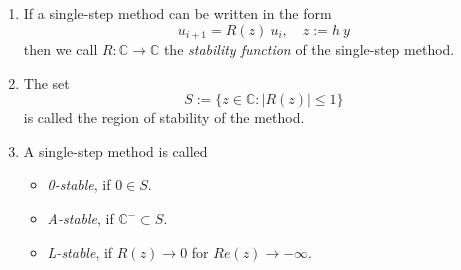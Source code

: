 		\begin{definition}
			\begin{enumerate}
				\item 
				If a single-step method can be written in the form
				\begin{equation}
					u_{i+1} = R(z) \ u_i, \quad z:= h \ y
				\end{equation}
				then we call $R: \mathbb{C} \to \mathbb{C}$ the \emph{stability function} of the single-step method.
				\item 
				The set
				\begin{equation}
					S := \{z \in \mathbb{C} : |R(z)| \leq 1\}
				\end{equation}
				is called the region of stability of the method.
				\item 
				A single-step method is called
				\begin{itemize}
					\item \emph{0-stable}, if $0 \in S$.
					\item \emph{A-stable}, if $\mathbb{C}^- \subset S$.
					\item \emph{L-stable}, if $R(z) \to 0$ for $Re(z) \to -\infty$.
				\end{itemize}
			\end{enumerate}
		\end{definition}

		
		
		
